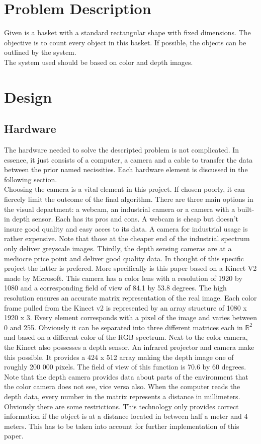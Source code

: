 \documentclass[11pt]{article}
\begin{document}
\section{Problem Description}

\hspace{\parindent} Given is a basket with a standard rectangular shape with fixed dimensions. The objective is to count every object in this basket. If possible, the objects can be outlined by the system.\\

\noindent The system used should be based on color and depth images.


\section{Design}
\subsection{Hardware}
The hardware needed to solve the descripted problem is not complicated. In essence, it just consists of a computer, a camera and a cable to transfer the data between the prior named necissities. Each hardware element is discussed in the following section. \\Choosing the camera is a vital element in this project. If chosen poorly, it can fiercely limit the outcome of the final algorithm. There are three main options in the visual department: a webcam, an industrial camera or a camera with a built-in depth sensor. Each has its pros and cons. A webcam is cheap but doesn't insure good quality and easy acces to its data. A camera for industrial usage is rather expensive. Note that those at the cheaper end of the industrial spectrum only deliver greyscale images. Thirdly, the depth sensing cameras are at a mediocre price point and deliver good quality data. In thought of this specific project the latter is prefered. More specifically is this paper based on a Kinect V2 made by Microsoft. This camera has a color lens with a resolution of 1920 by 1080 and a corresponding field of view of 84.1 by 53.8 degrees. The high resolution ensures an accurate matrix representation of the real image. Each color frame pulled from the Kinect v2 is represented by an array structure of 1080 x 1920 x 3. Every element corresponds with a pixel of the image and varies between 0 and 255. Obviously it can be separated into three different matrices each in $\mathbb{R}^{2}$ and based on a different color of the RGB spectrum. Next to the color camera, the Kinect also possesses a depth sensor. An infrared projector and camera make this possible. It provides a 424 x 512 array making the depth image one of roughly 200 000 pixels. The field of view of this function is 70.6 by 60 degrees. Note that the depth camera provides data about parts of the environment that the color camera does not see, vice versa also. When the computer reads the depth data, every number in the matrix represents a distance in millimeters. Obviously there are some restrictions. This technology only provides correct information if the object is at a distance located in between half a meter and 4 meters. This has to be taken into account for further implementation of this paper.
\end{document}
